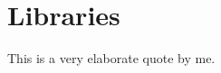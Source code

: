 %
%
% 
% 

\chapter{Libraries}

\label{chap:Libraries}

\begin{displayquote}
  This is a very elaborate quote by me.
\end{displayquote}
